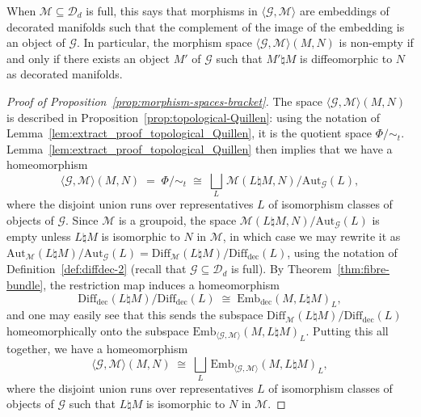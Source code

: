 \documentclass[AHL,Unicode,published]{cedram}
\newcommand{\Diff}{\mathrm{Diff}}
\newcommand{\Aut}{\mathrm{Aut}}
\newcommand{\rdec}{\mathrm{dec}}
\newcommand{\cD}{\mathcal{D}}
\newcommand{\cG}{\mathcal{G}}
\newcommand{\cM}{\mathcal{M}}
\newcommand{\diffdec}{\ensuremath{\mathrm{Diff}_{\rdec}}}
\newcommand{\embdec}{\ensuremath{\mathrm{Emb}_{\rdec}}}
\newcommand{\embgm}{\ensuremath{\mathrm{Emb}_{\langle \cG,\cM \rangle}}}
\begin{document}
\begin{rema}
When $\cM \subseteq \cD_{d}$ is full, this says that morphisms in $\langle \cG, \cM \rangle$ are embeddings of decorated manifolds such that the complement of the image of the embedding is an object of $\cG$. In particular, the morphism space $\langle \cG, \cM \rangle (M,N)$ is non-empty if and only if there exists an object $M'$ of $\cG$ such that $M' \natural M$ is diffeomorphic to $N$ as decorated manifolds.
\end{rema}

\begin{proof}[Proof of Proposition~\ref{prop:morphism-spaces-bracket}]
The space $\langle \cG, \cM \rangle (M,N)$ is described in Proposition~\ref{prop:topological-Quillen}: using the notation of Lemma~\ref{lem:extract_proof_topological_Quillen}, it is the quotient space $\Phi/{\sim_{t}}$. Lem\-ma~\ref{lem:extract_proof_topological_Quillen} then implies that we have a homeomorphism
\[
\langle \cG, \cM \rangle (M,N) \;=\; \Phi/{\sim_{t}} \;\cong\; \bigsqcup_L \, \cM(L\natural M,N) / \Aut_{\cG}(L),
\]
where the disjoint union runs over representatives $L$ of isomorphism classes of objects of $\cG$. Since $\cM$ is a groupoid, the space $\cM(L\natural M,N) / \Aut_{\cG}(L)$ is empty unless $L \natural M$ is isomorphic to $N$ in $\cM$, in which case we may rewrite it as $\Aut_\cM(L\natural M) / \Aut_{\cG}(L) = \Diff_{\cM}(L\natural M) / \diffdec(L)$, using the notation of Definition~\ref{def:diffdec-2} (recall that $\cG \subseteq \cD_{d}$ is full). By Theorem~\ref{thm:fibre-bundle}, the restriction map induces a homeomorphism
\begin{equation}\label{eq:restriction-map-identification}
\diffdec(L\natural M) / \diffdec(L) \;\cong\; \embdec(M,L\natural M)_L,
\end{equation}
and one may easily see that this sends the subspace $\Diff_{\cM}(L\natural M) / \diffdec(L)$ homeomorphically onto the subspace $\embgm(M,L\natural M)_L$. Putting this all together, we have a homeomorphism
\begin{equation}\label{eq:gm-decomposition}
\langle \cG, \cM \rangle (M,N) \;\cong\; \bigsqcup_L \, \embgm(M,L\natural M)_L,
\end{equation}
where the disjoint union runs over representatives $L$ of isomorphism classes of objects of $\cG$ such that $L \natural M$ is isomorphic to $N$ in $\cM$.


\end{proof}
\end{document}
